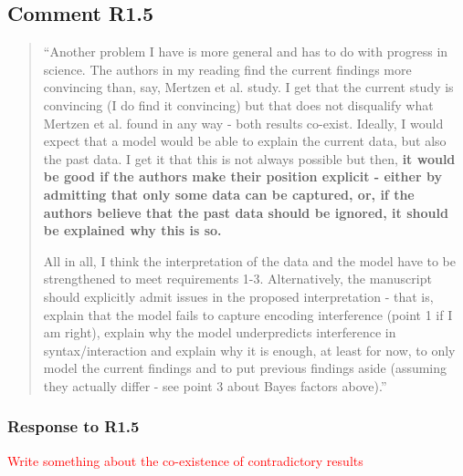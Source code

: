 \documentclass[12pt]{article}
\begin{document}


\subsection*{Comment R1.5}
\begin{quote}
``Another problem I have is more general and has to do with progress in science. The authors in my reading find the current findings more convincing than, say, Mertzen et al. study. I get that the current study is convincing (I do find it convincing) but that does not disqualify what Mertzen et al. found in any way - both results co-exist. Ideally, I would expect that a model would be able to explain the current data, but also the past data. I get it that this is not always possible but then, \textbf{it would be good if the authors make their position explicit - either by admitting that only some data can be captured, or, if the authors believe that the past data should be ignored, it should be explained why this is so.}

All in all, I think the interpretation of the data and the model have to be strengthened to meet requirements 1-3. Alternatively, the manuscript should explicitly admit issues in the proposed interpretation - that is, explain that the model fails to capture encoding interference (point 1 if I am right), explain why the model underpredicts interference in syntax/interaction and explain why it is enough, at least for now, to only model the current findings and to put previous findings aside (assuming they actually differ - see point 3 about Bayes factors above).''\end{quote}

\subsubsection*{Response to R1.5}
\textcolor{red}{Write something about the co-existence of contradictory results}
\end{document}
